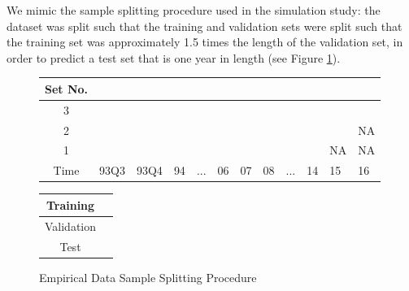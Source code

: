 \documentclass{article}
\begin{document}
We mimic the sample splitting procedure used in the simulation study: the dataset was split such that the training and validation sets were split such that the training set was approximately 1.5 times the length of the validation set, in order to predict a test set that is one year in length (see Figure \ref{emp_sample_split_diag}).
\begin{figure}[!htb]
	\fontsize{6}{8}\selectfont
	\begin{center}
		\begin{tabular}{|c|p{0.55cm}p{0.55cm}p{0.50cm}p{0.50cm}p{0.50cm}p{0.50cm}p{0.50cm}p{0.50cm}p{0.50cm}p{0.50cm}p{0.50cm}|}
			\hline
			Set No. &&&&&&&&&&& \\
			\hline
			3 & \cellcolor{cyan} & \cellcolor{cyan} & \cellcolor{cyan} & \cellcolor{cyan} & \cellcolor{cyan} & \cellcolor{cyan} & 
			\cellcolor{pink} & \cellcolor{pink} & \cellcolor{pink} & \cellcolor{pink} &  \cellcolor{olive} \\
			2 & \cellcolor{cyan} & \cellcolor{cyan} & \cellcolor{cyan} & \cellcolor{cyan} & \cellcolor{cyan} & 
			\cellcolor{pink} & \cellcolor{pink} & \cellcolor{pink} & \cellcolor{pink} & 	
			\cellcolor{olive} & NA \\
			1 & \cellcolor{cyan} & \cellcolor{cyan} & \cellcolor{cyan} & \cellcolor{cyan} & 
			\cellcolor{pink} & \cellcolor{pink} & \cellcolor{pink} & \cellcolor{pink} &
			\cellcolor{olive} & NA & NA \\
			\hline
			Time & 93Q3 & 93Q4 & 94 & ... & 06 & 07 & 08 & ... & 14 & 15 & 16 \\
			\hline
		\end{tabular}
		\medskip
		\begin{tabular}{|c|p{0.55cm}|}
			\hline
			Training & \cellcolor{cyan} \\
			\hline
			Validation & \cellcolor{pink} \\
			\hline
			Test & \cellcolor{olive} \\
			\hline
		\end{tabular}
	\end{center}
	\caption{Empirical Data Sample Splitting Procedure}
	\label{emp_sample_split_diag}
\end{figure}

\end{document}
